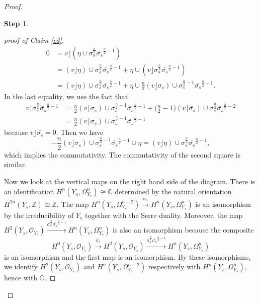 \documentclass[12pt,a4paper]{amsart}
\theoremstyle{remark}
\theoremstyle{definition}
\newtheorem{Step}{Step}
\begin{document}
\begin{proof}
\begin{Step}
\begin{proof}[proof of Claim \ref{cd}]
\begin{align*}
0 &= v \rfloor (\eta \cup \sigma_s^{\frac{n}{2}}\bar{\sigma_s}^{\frac{n}{2} -1}) \\
&= (v \rfloor \eta) \cup 
\sigma_s^{\frac{n}{2}}\bar{\sigma_s}^{\frac{n}{2} -1} + \eta \cup (v \rfloor \sigma_s^{\frac{n}{2}}\bar{\sigma_s}^{\frac{n}{2} -1})\\ 
&= (v \rfloor \eta) \cup 
\sigma_s^{\frac{n}{2}}\bar{\sigma_s}^{\frac{n}{2} -1} + \eta \cup \frac{n}{2}(v \rfloor \sigma_s) \cup  
\sigma_s^{\frac{n}{2}-1}\bar{\sigma_s}^{\frac{n}{2} -1}.
\end{align*}
In the last equality, we use the fact that 
\begin{align*}
v \rfloor \sigma_s^{\frac{n}{2}}\bar{\sigma_s}^{\frac{n}{2} -1} &= \frac{n}{2}(v \rfloor \sigma_s) \cup  
\sigma_s^{\frac{n}{2}-1}\bar{\sigma_s}^{\frac{n}{2} -1} + \bigl(\frac{n}{2} - 1\bigr)(v \rfloor \bar{\sigma_s}) \cup \sigma_s^{\frac{n}{2}} \bar{\sigma_s}^{\frac{n}{2} - 2}\\
&= \frac{n}{2}(v \rfloor \sigma_s) \cup  
\sigma_s^{\frac{n}{2}-1}\bar{\sigma_s}^{\frac{n}{2} -1}
\end{align*}
because 
$v \rfloor \bar{\sigma_s} = 0$. 
Then we have 
$$-\frac{n}{2}(v \rfloor \sigma_s) \cup  
\sigma_s^{\frac{n}{2}-1}\bar{\sigma_s}^{\frac{n}{2} -1} \cup \eta = 
(v \rfloor \eta) \cup 
\sigma_s^{\frac{n}{2}}\bar{\sigma_s}^{\frac{n}{2} -1},$$ which implies the commutativity. The commutativity 
of the second square is similar. 

Now we look at the vertical maps on the right hand side 
of the diagram. 
There is an identification 
$H^n(Y_s, \Omega^n_{Y_s}) \cong \mathbb{C}$ determined 
by the natural orientation $H^{2n}(Y_s, \mathbb{Z}) \cong \mathbb{Z}$. The map 
$H^n(Y_s, \Omega^{n-2}_{Y_s}) \stackrel{\sigma_s}\to H^n(Y_s, \Omega^n_{Y_s})$ is an isomorphism 
by the irreducibility of $Y_s$ 
together with the Serre duality. 
Moreover, the map  
$H^2(Y_s, \mathcal{O}_{Y_s}) \stackrel{\sigma_s^{\frac{n}{2} }\bar{\sigma_s}^{\frac{n}{2}-1}}\longrightarrow H^n(Y_s, \Omega^n_{Y_s})$ is also an isomorphism because the composite  
$$H^0(Y_s, \mathcal{O}_{Y_s}) \stackrel{\bar{\sigma}_s}\to H^2(Y_s, \mathcal{O}_{Y_s})
\stackrel{\sigma_s^{\frac{n}{2} }\bar{\sigma_s}^{\frac{n}{2}-1}}\to H^n(Y_s, \Omega^n_{Y_s})$$ is an isomorphism and the first map  
is an isomorphism. By these isomorphisms, 
we identify 
$H^2(Y_s, \mathcal{O}_{Y_s})$ and $H^n(Y_s, \Omega^{n-2}_{Y_s})$ respectively with $H^n(Y_s, \Omega_{Y_s}^n)$, hence with $\mathbb{C}$. 


\end{proof}
\end{Step}
\end{proof}
\end{document}
